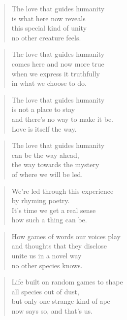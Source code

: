 \documentclass[14pt,a4paper]{article}
\begin{document}
\begin{verse}
The love that guides humanity\\
is what here now reveals\\
this special kind of unity\\
no other creature feels.
\end{verse}

\begin{verse}
The love that guides humanity\\
comes here and now more true\\
when we express it truthfully\\
in what we choose to do.
\end{verse}

\begin{verse}
The love that guides humanity\\
is not a place to stay\\
and there’s no way to make it be.\\
Love is itself the way.
\end{verse}

\begin{verse}
The love that guides humanity\\
can be the way ahead,\\
the way towards the mystery\\
of where we will be led.
\end{verse}


\begin{verse}
We’re led through this experience\\
by rhyming poetry.\\
It’s time we get a real sense\\
how such a thing can be.
\end{verse}

\begin{verse}
How games of words our voices play\\
and thoughts that they disclose\\
unite us in a novel way\\
no other species knows.
\end{verse}

\begin{verse}
Life built on random games to shape\\
all species out of dust,\\
but only one strange kind of ape\\
now says so, and that’s us.
\end{verse}
\end{document}
